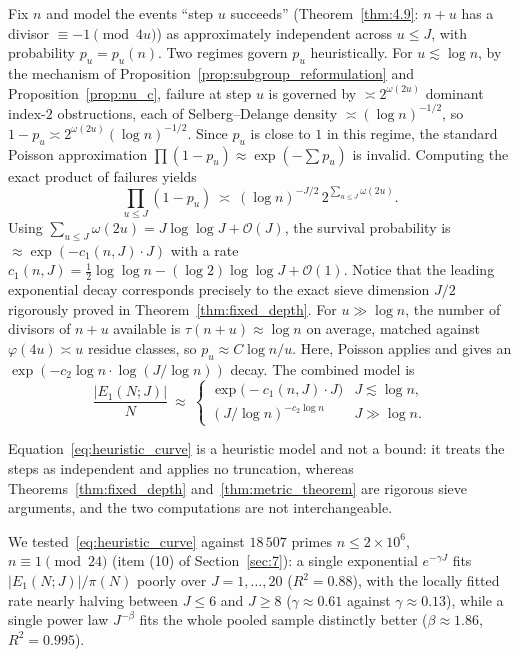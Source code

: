 \documentclass[11pt, a4paper]{article}
\theoremstyle{plain}
\theoremstyle{definition}
\begin{document}
Fix $n$ and model the events ``step $u$ succeeds'' (Theorem~\ref{thm:4.9}: $n+u$ has a divisor $\equiv-1\pmod{4u}$) as approximately independent across $u\le J$, with probability $p_u=p_u(n)$. Two regimes govern $p_u$ heuristically. For $u\lesssim\log n$, by the mechanism of Proposition~\ref{prop:subgroup_reformulation} and Proposition~\ref{prop:nu_c}, failure at step $u$ is governed by $\asymp2^{\omega(2u)}$ dominant index-$2$ obstructions, each of Selberg--Delange density $\asymp(\log n)^{-1/2}$, so $1-p_u\asymp2^{\omega(2u)}(\log n)^{-1/2}$. Since $p_u$ is close to $1$ in this regime, the standard Poisson approximation $\prod(1-p_u)\approx\exp(-\sum p_u)$ is invalid. Computing the exact product of failures yields
$$\prod_{u\le J}(1-p_u)\ \asymp\ (\log n)^{-J/2}\,2^{\sum_{u\le J}\omega(2u)} .$$
Using $\sum_{u\le J}\omega(2u)=J\log\log J+\mathcal{O}(J)$, the survival probability is $\approx \exp(-c_1(n,J)\cdot J)$ with a rate $c_1(n,J) = \frac{1}{2}\log\log n - (\log 2)\log\log J + \mathcal{O}(1)$. Notice that the leading exponential decay corresponds precisely to the exact sieve dimension $J/2$ rigorously proved in Theorem~\ref{thm:fixed_depth}. For $u\gg\log n$, the number of divisors of $n+u$ available is $\tau(n+u)\approx\log n$ on average, matched against $\varphi(4u)\asymp u$ residue classes, so $p_u\approx C\log n/u$. Here, Poisson applies and gives an $\exp(-c_2\log n\cdot\log(J/\log n))$ decay. The combined model is
\begin{equation}\label{eq:heuristic_curve}
\frac{|E_1(N;J)|}{N}\ \approx\
\begin{cases}
\exp\big(-c_1(n,J) \cdot J\big) & J\lesssim\log n,\\[2pt]
(J/\log n)^{-c_2\log n} & J\gg\log n.
\end{cases}
\end{equation}

Equation~\eqref{eq:heuristic_curve} is a heuristic model and not a bound: it treats the steps as independent and applies no truncation, whereas Theorems~\ref{thm:fixed_depth} and~\ref{thm:metric_theorem} are rigorous sieve arguments, and the two computations are not interchangeable.

We tested~\eqref{eq:heuristic_curve} against $18\,507$ primes $n\le2\times10^{6}$, $n\equiv1\pmod{24}$ (item (10) of Section~\ref{sec:7}): a single exponential $e^{-\gamma J}$ fits $|E_1(N;J)|/\pi(N)$ poorly over $J=1,\ldots,20$ ($R^{2}=0.88$), with the locally fitted rate nearly halving between $J\le6$ and $J\ge8$ ($\gamma\approx0.61$ against $\gamma\approx0.13$), while a single power law $J^{-\beta}$ fits the whole pooled sample distinctly better ($\beta\approx1.86$, $R^{2}=0.995$).
\end{document}
